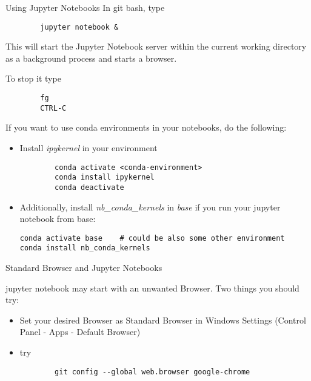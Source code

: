 \begin{frame}[fragile]{Using Jupyter Notebooks}
		In git bash, type
		\begin{verbatim}
		jupyter notebook &
		\end{verbatim}
		This will start the Jupyter Notebook server within the current working directory as a background process and starts a browser.
		
		To stop it type
		\begin{verbatim}
		fg
		CTRL-C
		\end{verbatim}
		
		If you want to use conda environments in your notebooks, do the following:
		\begin{itemize}
			\item Install \textit{ipykernel} in your environment
		
		\begin{verbatim}
		conda activate <conda-environment>
		conda install ipykernel
		conda deactivate
		\end{verbatim}
		\item Additionally, install \textit{nb\_conda\_kernels} in \textit{base} if you run your jupyter notebook from base:
		\begin{verbatim}
conda activate base    # could be also some other environment
conda install nb_conda_kernels
		 \end{verbatim}
		\end{itemize}
		
\end{frame}

\begin{frame}[fragile]{Standard Browser and Jupyter Notebooks}
	
	jupyter notebook may start with an unwanted Browser. Two things you should try:
	\begin{itemize}
		\item Set your desired Browser as Standard Browser in Windows Settings (Control Panel - Apps - Default Browser)
		\item try
			\begin{verbatim}
		git config --global web.browser google-chrome	\end{verbatim}
		
	\end{itemize}
	
\end{frame}

